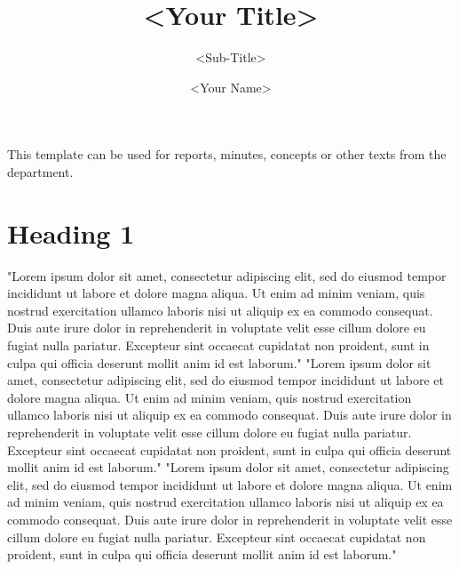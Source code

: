 \documentclass[a4paper,11pt]{article}
\begin{document}
\title{<Your Title>}
\subtitle{<Sub-Title>}
\author{<Your Name>}

\maketitle



\pt 




\noindent This template can be used for reports, minutes, concepts or other texts from the
department.
%

\section{Heading 1}
"Lorem ipsum dolor sit amet, consectetur adipiscing elit, sed do eiusmod tempor
incididunt ut labore et dolore magna aliqua. Ut enim ad minim veniam, quis
nostrud exercitation ullamco laboris nisi ut aliquip ex ea commodo consequat.
Duis aute irure dolor in reprehenderit in voluptate velit esse cillum dolore eu
fugiat nulla pariatur. Excepteur sint occaecat cupidatat non proident, sunt in
culpa qui officia deserunt mollit anim id est laborum." "Lorem ipsum dolor sit
amet, consectetur adipiscing elit, sed do eiusmod tempor incididunt ut labore et
dolore magna aliqua. Ut enim ad minim veniam, quis nostrud exercitation ullamco
laboris nisi ut aliquip ex ea commodo consequat. Duis aute irure dolor in
reprehenderit in voluptate velit esse cillum dolore eu fugiat nulla pariatur.
Excepteur sint occaecat cupidatat non proident, sunt in culpa qui officia
deserunt mollit anim id est laborum." "Lorem ipsum dolor sit amet, consectetur
adipiscing elit, sed do eiusmod tempor incididunt ut labore et dolore magna
aliqua. Ut enim ad minim veniam, quis nostrud exercitation ullamco laboris nisi
ut aliquip ex ea commodo consequat. Duis aute irure dolor in reprehenderit in
voluptate velit esse cillum dolore eu fugiat nulla pariatur. Excepteur sint
occaecat cupidatat non proident, sunt in culpa qui officia deserunt mollit anim
id est laborum."
\end{document}
